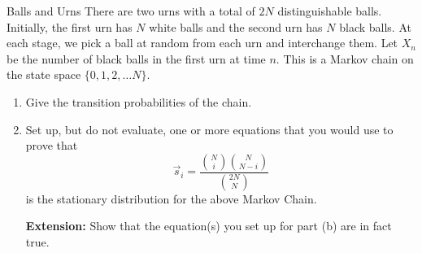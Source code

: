 \documentclass[11.5pt]{article}
\begin{document}
\begin{exercise} {Balls and Urns} 
There are two urns with a total of $2N$ distinguishable balls. Initially, the first urn has $N$ white balls and the second urn has $N$ black balls. At each stage, we pick a ball at random from each urn and interchange them. Let $X_n$ be the number of black balls in
the first urn at time $n$. This is a Markov chain on the state space $\{0,1, 2, \ldots N\}$. 

\begin{enumerate}
\item 
Give the transition probabilities of the chain.

\item Set up, but do not evaluate, one or more equations that you would use to prove that $$\vec{s}_i = \frac{{N \choose i}{N \choose {N - i} }}{{2N \choose N}}$$ is the stationary distribution for the above Markov Chain. 

\textbf{Extension: } Show that the equation(s) you set up for part (b) are in fact true.
\end{enumerate}
\end{exercise} 
\end{document}
